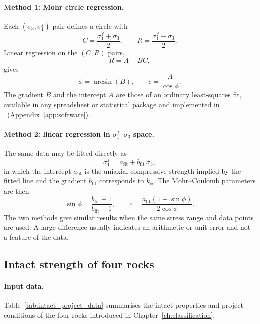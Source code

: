 \paragraph{Method 1: Mohr circle regression.}
Each \((\sigma_3,\sigma_1^f)\) pair defines a circle with
\[
C = \frac{\sigma_1^f+\sigma_3}{2},
\qquad
R = \frac{\sigma_1^f-\sigma_3}{2} .
\]
Linear regression on the \((C,R)\) pairs,
\[
R = A + B C ,
\]
gives
\[
\phi = \arcsin(B),
\qquad
c = \frac{A}{\cos\phi} .
\]
The gradient $B$ and the intercept $A$ are those of an ordinary
least-squares fit, available in any
spreadsheet or statistical package and implemented in \companionname\
(Appendix~\ref{app:software}).

\paragraph{Method 2: linear regression in \(\sigma_1^f\)--\(\sigma_3\) space.}
The same data may be fitted directly as
\[
\sigma_1^f = a_{\mathrm{fit}} + b_{\mathrm{fit}}\,\sigma_3 ,
\]
in which the intercept \(a_{\mathrm{fit}}\) is the uniaxial compressive
strength implied by the fitted line and the gradient \(b_{\mathrm{fit}}\)
corresponds to \(k_\phi\). The Mohr--Coulomb parameters are then
\[
\sin\phi = \frac{b_{\mathrm{fit}}-1}{b_{\mathrm{fit}}+1} ,
\qquad
c =
\frac{a_{\mathrm{fit}}(1-\sin\phi)}
{2\cos\phi} .
\]
The two methods give similar results when the same stress range and data
points are used. A large difference usually indicates an arithmetic or unit
error and not a feature of the data.

\subsection{Intact strength of four rocks}
\label{sec:design-data-and-stress-calculation}

\paragraph{Input data.}
Table~\ref{tab:intact_project_data} summarises the intact properties and
project conditions of the four rocks introduced in
Chapter~\ref{ch:classification}.

